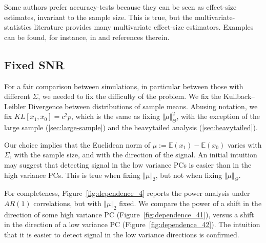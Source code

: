 \documentclass[]{bio}
\begin{document}
Some authors prefer accuracy-tests because they can be seen as effect-size estimates, invariant to the sample size. 
This is true, but the multivariate-statistics literature provides many multivariate effect-size estimators. 
Examples can be found, for instance, in \cite{stevens2012applied} and references therein. 




\subsection{Fixed SNR}
\label{sec:fix_snr}

For a fair comparison between simulations, in particular between those with different $\Sigma$, we needed to fix the difficulty of the problem.
We fix the Kullback–Leibler Divergence between distributions of sample means. 
Abusing notation, we fix $KL[\bar x_1,\bar x_0]=c^2 p$, which is the same as fixing $\Vert \mu \Vert^2_\Theta$, with the exception of the large sample (\ref{sec:large-sample}) and the heavytailed analysis (\ref{sec:heavytailed}). 

Our choice implies that the Euclidean norm of $\mu:=\mathbb{E}(x_1)-\mathbb{E}(x_0)$ varies with $\Sigma$, with the sample size, and with the direction of the signal.
An initial intuition may suggest that detecting signal in the low variance PCs is easier than in the high variance PCs. 
This is true when fixing $\Vert \mu \Vert_2$, but not when fixing $\Vert \mu \Vert_{\Theta}$.

For completeness, Figure~\ref{fig:dependence_4} reports the power analysis under $AR(1)$ correlations, but with $\Vert \mu \Vert_2$ fixed.
We compare the power of a shift in the direction of some high variance PC (Figure~\ref{fig:dependence_41}), versus a shift in the direction of a low variance PC (Figure~\ref{fig:dependence_42}).
The intuition that it is easier to detect signal in the low variance directions is confirmed. 
\end{document}

